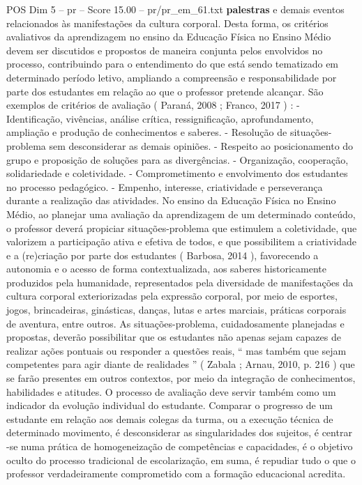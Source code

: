 \begin{textsample}{POS Dim 5 – pr – Score 15.00 – pr/pr\_em\_61.txt}
\textbf{palestras} e demais eventos relacionados às manifestações da cultura corporal.
Desta forma, os critérios avaliativos da aprendizagem no ensino da Educação Física no Ensino Médio devem ser discutidos e propostos de maneira conjunta pelos envolvidos no processo, contribuindo para o entendimento do que está sendo tematizado em determinado período letivo, ampliando a compreensão e responsabilidade por parte dos estudantes em relação ao que o professor pretende alcançar.
São exemplos de critérios de avaliação ( Paraná, 2008 ; Franco, 2017 ) : - Identificação, vivências, análise crítica, ressignificação, aprofundamento, ampliação e produção de conhecimentos e saberes. - Resolução de situações-problema sem desconsiderar as demais opiniões. - Respeito ao posicionamento do grupo e proposição de soluções para as divergências. - Organização, cooperação, solidariedade e coletividade. - Comprometimento e envolvimento dos estudantes no processo pedagógico. - Empenho, interesse, criatividade e perseverança durante a realização das atividades.
No ensino da Educação Física no Ensino Médio, ao planejar uma avaliação da aprendizagem de um determinado conteúdo, o professor deverá propiciar situações-problema que estimulem a coletividade, que valorizem a participação ativa e efetiva de todos, e que possibilitem a criatividade e a (re)criação por parte dos estudantes ( Barbosa, 2014 ), favorecendo a autonomia e o acesso de forma contextualizada, aos saberes historicamente produzidos pela humanidade, representados pela diversidade de manifestações da cultura corporal exteriorizadas pela expressão corporal, por meio de esportes, jogos, brincadeiras, ginásticas, danças, lutas e artes marciais, práticas corporais de aventura, entre outros.
As situações-problema, cuidadosamente planejadas e propostas, deverão possibilitar que os estudantes não apenas sejam capazes de realizar ações pontuais ou responder a questões reais, “ mas também que sejam competentes para agir diante de realidades ” ( Zabala ; Arnau, 2010, p. 216 ) que se farão presentes em outros contextos, por meio da integração de conhecimentos, habilidades e atitudes.
O processo de avaliação deve servir também como um indicador da evolução individual do estudante.
Comparar o progresso de um estudante em relação aos demais colegas da turma, ou a execução técnica de determinado movimento, é desconsiderar as singularidades dos sujeitos, é centrar -se numa prática de homogeneização de competências e capacidades, é o objetivo oculto do processo tradicional de escolarização, em suma, é repudiar tudo o que o professor verdadeiramente comprometido com a formação educacional acredita.

\end{textsample}
